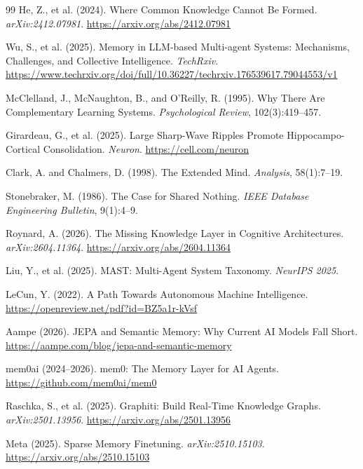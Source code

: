 \documentclass[11pt,letterpaper]{article}
\begin{document}
\begin{thebibliography}{99}
He, Z., et al. (2024).
\newblock Where Common Knowledge Cannot Be Formed.
\newblock \textit{arXiv:2412.07981}. \url{https://arxiv.org/abs/2412.07981}

Wu, S., et al. (2025).
\newblock Memory in LLM-based Multi-agent Systems: Mechanisms, Challenges, and Collective Intelligence.
\newblock \textit{TechRxiv}. \url{https://www.techrxiv.org/doi/full/10.36227/techrxiv.176539617.79044553/v1}

McClelland, J., McNaughton, B., and O'Reilly, R. (1995).
\newblock Why There Are Complementary Learning Systems.
\newblock \textit{Psychological Review}, 102(3):419--457.

Girardeau, G., et al. (2025).
\newblock Large Sharp-Wave Ripples Promote Hippocampo-Cortical Consolidation.
\newblock \textit{Neuron}. \url{https://cell.com/neuron}

Clark, A. and Chalmers, D. (1998).
\newblock The Extended Mind.
\newblock \textit{Analysis}, 58(1):7--19.

Stonebraker, M. (1986).
\newblock The Case for Shared Nothing.
\newblock \textit{IEEE Database Engineering Bulletin}, 9(1):4--9.

Roynard, A. (2026).
\newblock The Missing Knowledge Layer in Cognitive Architectures.
\newblock \textit{arXiv:2604.11364}. \url{https://arxiv.org/abs/2604.11364}

Liu, Y., et al. (2025).
\newblock MAST: Multi-Agent System Taxonomy.
\newblock \textit{NeurIPS 2025}.

LeCun, Y. (2022).
\newblock A Path Towards Autonomous Machine Intelligence.
\newblock \url{https://openreview.net/pdf?id=BZ5a1r-kVsf}

Aampe (2026).
\newblock JEPA and Semantic Memory: Why Current AI Models Fall Short.
\newblock \url{https://aampe.com/blog/jepa-and-semantic-memory}

mem0ai (2024--2026).
\newblock mem0: The Memory Layer for AI Agents.
\newblock \url{https://github.com/mem0ai/mem0}

Raschka, S., et al. (2025).
\newblock Graphiti: Build Real-Time Knowledge Graphs.
\newblock \textit{arXiv:2501.13956}. \url{https://arxiv.org/abs/2501.13956}

Meta (2025).
\newblock Sparse Memory Finetuning.
\newblock \textit{arXiv:2510.15103}. \url{https://arxiv.org/abs/2510.15103}

\end{thebibliography}
\end{document}
